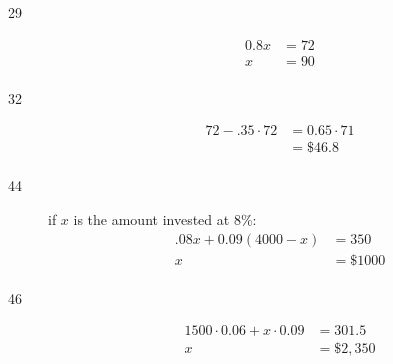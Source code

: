\documentclass[letterpaper, landscape]{exam}
\begin{document}
  \begin{description}

    \item[29]
      \begin{align*}
        0.8x & = 72 \\
        x    & = \boxed{ 90 } \\
      \end{align*}

    \item[32]
      \begin{align*}
        72 - .35 \cdot 72 & = 0.65 \cdot 71 \\
                          & = \boxed{ \$46.8 } \\
      \end{align*}

    \item[44]
      if $x$ is the amount invested at 8\%:
      \begin{align*}
        .08x + 0.09(4000 - x) & = 350 \\
        x                     & = \boxed{ \$1000 } \\
      \end{align*}

    \item[46]
      \begin{align*}
        1500 \cdot 0.06 + x \cdot 0.09 & = 301.5 \\
        x                              & = \boxed{ \$2,350 } \\
      \end{align*}

  \end{description}
  
\end{document}
